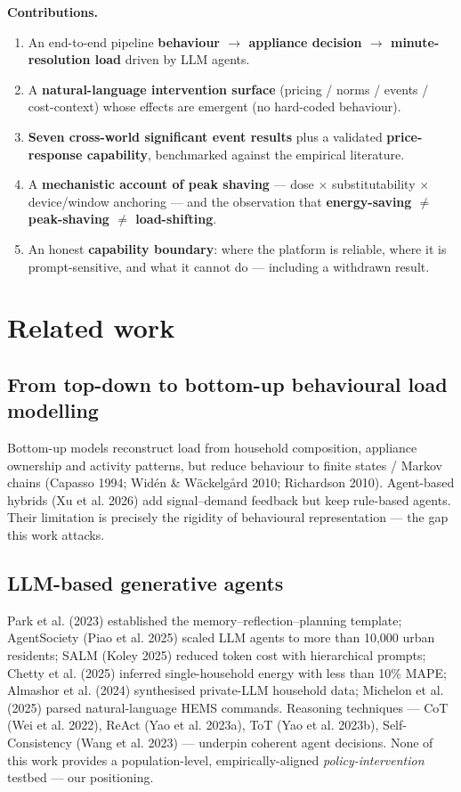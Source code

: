 \documentclass[11pt]{article}
\begin{document}
\noindent\textbf{Contributions.}
\begin{enumerate}
\item An end-to-end pipeline \textbf{behaviour $\rightarrow$ appliance decision $\rightarrow$
minute-resolution load} driven by LLM agents.
\item A \textbf{natural-language intervention surface} (pricing / norms / events / cost-context) whose
effects are emergent (no hard-coded behaviour).
\item \textbf{Seven cross-world significant event results} plus a validated \textbf{price-response
capability}, benchmarked against the empirical literature.
\item A \textbf{mechanistic account of peak shaving} --- dose $\times$ substitutability $\times$
device/window anchoring --- and the observation that \textbf{energy-saving $\neq$ peak-shaving $\neq$
load-shifting}.
\item An honest \textbf{capability boundary}: where the platform is reliable, where it is prompt-sensitive,
and what it cannot do --- including a withdrawn result.
\end{enumerate}

\section{Related work}
\subsection{From top-down to bottom-up behavioural load modelling}
Bottom-up models reconstruct load from household composition, appliance ownership and activity patterns,
but reduce behaviour to finite states / Markov chains (Capasso 1994; Wid\'en \& W\"ackelg\r{a}rd 2010;
Richardson 2010). Agent-based hybrids (Xu et al. 2026) add signal--demand feedback but keep rule-based
agents. Their limitation is precisely the rigidity of behavioural representation --- the gap this work
attacks.

\subsection{LLM-based generative agents}
Park et al. (2023) established the memory--reflection--planning template; AgentSociety (Piao et al. 2025)
scaled LLM agents to more than 10{,}000 urban residents; SALM (Koley 2025) reduced token cost with
hierarchical prompts; Chetty et al. (2025) inferred single-household energy with less than 10\% MAPE;
Almashor et al. (2024) synthesised private-LLM household data; Michelon et al. (2025) parsed
natural-language HEMS commands. Reasoning techniques --- CoT (Wei et al. 2022), ReAct (Yao et al. 2023a),
ToT (Yao et al. 2023b), Self-Consistency (Wang et al. 2023) --- underpin coherent agent decisions. None of
this work provides a population-level, empirically-aligned \emph{policy-intervention} testbed --- our
positioning.
\end{document}
